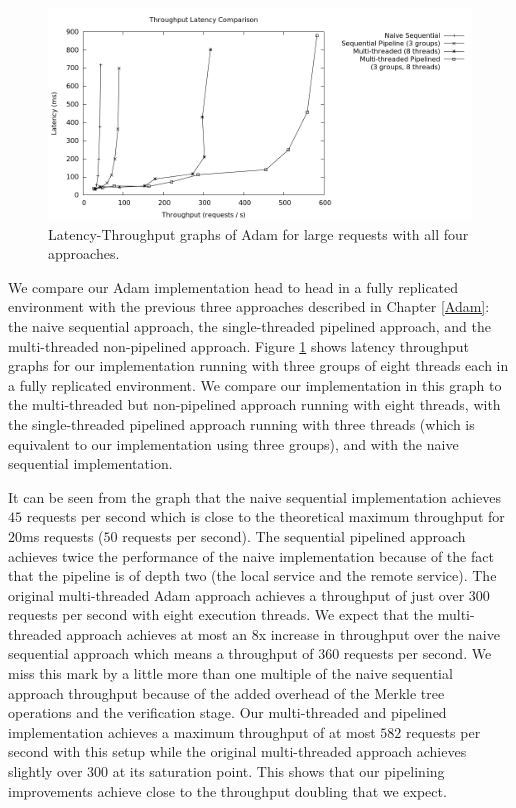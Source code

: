 \documentclass[11pt, oneside]{report}
\begin{document}
\begin{figure}[h]
\centering
\includegraphics[width=1.0\textwidth]{graphs/latencythroughput/graph.png}
\caption{\label{head2head}Latency-Throughput graphs of Adam for large requests with all four approaches.}
\end{figure}

We compare our Adam implementation head to head in a fully replicated environment with the previous three approaches described in Chapter \ref{Adam}: the naive sequential approach, the single-threaded pipelined approach, and the multi-threaded non-pipelined approach. 
Figure \ref{head2head} shows latency throughput graphs for our implementation running with three groups of eight threads each in a fully replicated environment. 
We compare our implementation in this graph to the multi-threaded but non-pipelined approach running with eight threads, with the single-threaded pipelined approach running with three threads (which is equivalent to our implementation using three groups), and with the naive sequential implementation. 

It can be seen from the graph that the naive sequential implementation achieves $45$ requests per second which is close to the theoretical maximum throughput for $20$ms requests ($50$ requests per second). 
The sequential pipelined approach achieves twice the performance of the naive implementation because of the fact that the pipeline is of depth two (the local service and the remote service).
The original multi-threaded Adam approach achieves a throughput of just over $300$ requests per second with eight execution threads. 
We expect that the multi-threaded approach achieves at most an 8x increase in throughput over the naive sequential approach which means a throughput of $360$ requests per second.
We miss this mark by a little more than one multiple of the naive sequential approach throughput because of the added overhead of the Merkle tree operations and the verification stage.
Our multi-threaded and pipelined implementation achieves a maximum throughput of at most $582$ requests per second with this setup while the original multi-threaded approach achieves slightly over $300$ at its saturation point. 
This shows that our pipelining improvements achieve close to the throughput doubling that we expect.
\end{document}
